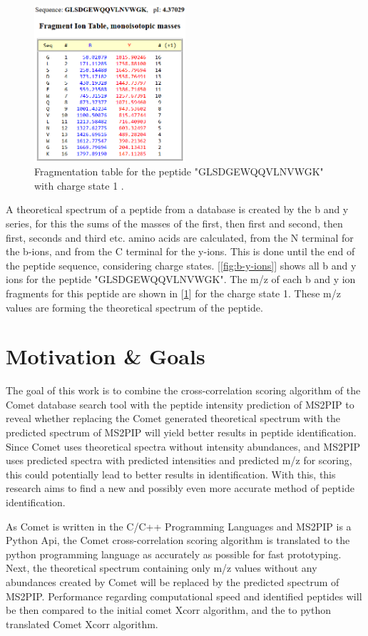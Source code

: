 \documentclass[11pt]{article}
\begin{document}
\begin{figure}
\centering
\includegraphics[width=0.5\textwidth]{figs/fragment-ion-table.png}
\caption{Fragmentation table for the peptide "GLSDGEWQQVLNVWGK" with charge state 1 \cite{b-y-frag}.}
\label{fig:fragment-table}
\end{figure}
A theoretical spectrum of a peptide from a database is created by the b and y series, for this the sums of the masses of the first, then first and second, then first, seconds and third etc. amino acids are calculated, from the N terminal for the b-ions, and from the C terminal for the y-ions. This is done until the end of the peptide sequence, considering charge states. [\cref{fig:b-y-ions}] shows all b and y ions for the peptide "GLSDGEWQQVLNVWGK".
The m/z of each b and y ion fragments for this peptide are shown in [\cref{fig:fragment-table}] for the charge state 1. These m/z values are forming the theoretical spectrum of the peptide. 

\newpage

\section{Motivation \& Goals}
The goal of this work is to combine the cross-correlation scoring algorithm of the Comet database search tool
with the peptide intensity prediction of MS2PIP to reveal whether replacing the Comet generated theoretical spectrum with the predicted spectrum of MS2PIP will yield better results in peptide identification. Since Comet uses theoretical spectra without intensity abundances, and MS2PIP uses predicted spectra with predicted intensities and predicted m/z for scoring, this could potentially lead to better results in identification. With this, this research aims to find a new and possibly even more accurate method of peptide identification.

As Comet is written in the C/C++ Programming Languages and MS2PIP is a Python Api, the Comet cross-correlation scoring algorithm is translated to the python programming language as accurately as possible for fast prototyping. Next, the theoretical spectrum containing only m/z values without any abundances created by Comet will be replaced by the predicted spectrum of MS2PIP. Performance regarding computational speed and identified peptides will be then compared to the initial comet Xcorr algorithm, and the to python translated Comet Xcorr algorithm. 
\end{document}
